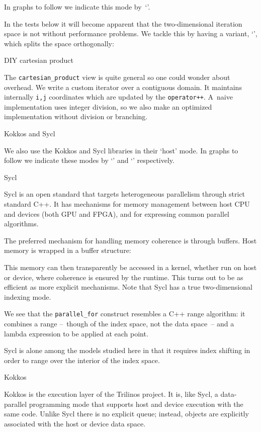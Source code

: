 In graphs to follow we indicate this mode by~`'.

In the tests below it will become apparent that the two-dimensional
iteration space is not without performance problems.
We tackle this by having a variant, `',
which splits the space orthogonally:
%

 {DIY cartesian product}

The \lstinline{cartesian_product} view is quite general
so one could wonder about overhead.
We write a custom iterator over a contiguous domain.
It maintains internally \lstinline{i,j} coordinates
which are updated by the \lstinline{operator++}.
A~naive implementation uses integer division, so we also
make an optimized implementation without division or branching.
%

 {Kokkos and Sycl}

We also use the Kokkos and Sycl libraries in their `host' mode.
In graphs to follow we indicate these modes
by `' and `' respectively.

 {Sycl}

Sycl is an open standard that targets
heterogeneous parallelism through strict standard C++.
It has mechanisms for memory management between host CPU
and devices (both GPU and FPGA),
and for expressing common parallel algorithms.

The preferred mechanism for handling memory coherence is through buffers.
Host memory is wrapped in a buffer structure:

This memory can then transparently be accessed in a kernel,
whether run on host or device,
where coherence is ensured by the runtime.
This turns out to be as efficient as more explicit mechanisms.
%
%
Note that Sycl has a true two-dimensional indexing mode.

We see that the \lstinline{parallel_for} construct
resembles a C++ range algorithm: it combines
a range --~though of the index space, not the data space~--
and a lambda expression to be applied at each point.

Sycl is alone among the models studied here
in that it requires index shifting 
in order to range over the interior of the index space.

 {Kokkos}

Kokkos is the execution layer of the Trilinos project.
It is, like Sycl, a data-parallel programming mode
that supports host and device execution with the same code.
Unlike Sycl there is no explicit queue; instead,
objects are explicitly associated with the host or device data space.

